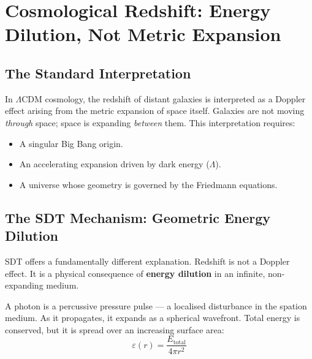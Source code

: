 
\chapter{Cosmological Redshift: Energy Dilution, Not Metric Expansion}
\label{ch:cosmological-redshift}


\section{The Standard Interpretation}

In $\Lambda$CDM cosmology, the redshift of distant galaxies is interpreted as a Doppler effect arising from the metric expansion of space itself.  Galaxies are not moving \emph{through} space; space is expanding \emph{between} them.  This interpretation requires:
\begin{itemize}
  \item A singular Big Bang origin.
  \item An accelerating expansion driven by dark energy ($\Lambda$).
  \item A universe whose geometry is governed by the Friedmann equations.
\end{itemize}


\section{The SDT Mechanism: Geometric Energy Dilution}

SDT offers a fundamentally different explanation.  Redshift is not a Doppler effect.  It is a physical consequence of \textbf{energy dilution} in an infinite, non-expanding medium.

A photon is a percussive pressure pulse --- a localised disturbance in the spation medium.  As it propagates, it expands as a spherical wavefront.  Total energy is conserved, but it is spread over an increasing surface area:
\begin{equation}\label{eq:dilution}
  \varepsilon(r) = \frac{E_{\text{total}}}{4\pi r^2}
\end{equation}

